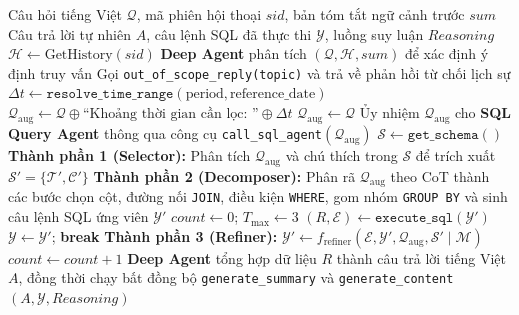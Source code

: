 \documentclass[12pt,a4paper]{report}
\begin{document}
\begin{algorithm}[H]
\caption{Quy trình phối hợp Đa tác tử Text-to-SQL trên LangGraph}
\label{alg:multi_agent_pipeline}
\begin{algorithmic}[1]
\Require Câu hỏi tiếng Việt $\mathcal{Q}$, mã phiên hội thoại $sid$, bản tóm tắt ngữ cảnh trước $sum$
\Ensure Câu trả lời tự nhiên $A$, câu lệnh SQL đã thực thi $\mathcal{Y}$, luồng suy luận $Reasoning$
\State $\mathcal{H} \gets \text{GetHistory}(sid)$
\State \textbf{Deep Agent} phân tích $(\mathcal{Q}, \mathcal{H}, sum)$ để xác định ý định truy vấn
    \State Gọi \texttt{out\_of\_scope\_reply(topic)} và trả về phản hồi từ chối lịch sự
\EndIf
{}
    \State $\Delta t \gets \texttt{resolve\_time\_range}(\text{period}, \text{reference\_date})$
    \State $\mathcal{Q}_{\text{aug}} \gets \mathcal{Q} \oplus \text{``Khoảng thời gian cần lọc: ''} \oplus \Delta t$
\Else
    \State $\mathcal{Q}_{\text{aug}} \gets \mathcal{Q}$
\EndIf
\State Ủy nhiệm $\mathcal{Q}_{\text{aug}}$ cho \textbf{SQL Query Agent} thông qua công cụ \texttt{call\_sql\_agent}$(\mathcal{Q}_{\text{aug}})$
\State $\mathcal{S} \gets \texttt{get\_schema}()$ 
\State \textbf{Thành phần 1 (Selector):} Phân tích $\mathcal{Q}_{\text{aug}}$ và chú thích trong $\mathcal{S}$ để trích xuất $\mathcal{S}' = \{\mathcal{T}', \mathcal{C}'\}$
\State \textbf{Thành phần 2 (Decomposer):} Phân rã $\mathcal{Q}_{\text{aug}}$ theo CoT thành các bước chọn cột, đường nối \texttt{JOIN}, điều kiện \texttt{WHERE}, gom nhóm \texttt{GROUP BY} và sinh câu lệnh SQL ứng viên $\mathcal{Y}'$
\State $count \gets 0$; \quad $T_{\max} \gets 3$
    \State $(R, \mathcal{E}) \gets \texttt{execute\_sql}(\mathcal{Y}')$ 
        \State $\mathcal{Y} \gets \mathcal{Y}'$; \quad \textbf{break}
    \Else
        \State \textbf{Thành phần 3 (Refiner):} $\mathcal{Y}' \gets f_{\text{refiner}}(\mathcal{E}, \mathcal{Y}', \mathcal{Q}_{\text{aug}}, \mathcal{S}' \mid \mathcal{M})$
        \State $count \gets count + 1$
    \EndIf
\EndWhile
\State \textbf{Deep Agent} tổng hợp dữ liệu $R$ thành câu trả lời tiếng Việt $A$, đồng thời chạy bất đồng bộ \texttt{generate\_summary} và \texttt{generate\_content}
\State \Return $(A, \mathcal{Y}, Reasoning)$
\end{algorithmic}
\end{algorithm}
\end{document}
